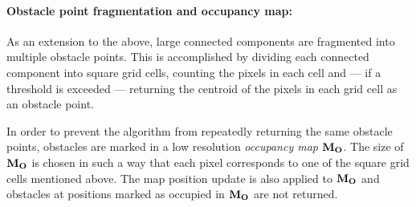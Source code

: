 \paragraph{Obstacle point fragmentation and occupancy map:} As an extension to the above, large connected components are fragmented into multiple obstacle points. This is accomplished by dividing each connected component into square grid cells, counting the pixels in each cell and --- if a threshold is exceeded --- returning the centroid of the pixels in each grid cell as an obstacle point.

In order to prevent the algorithm from repeatedly returning the same obstacle points, obstacles are marked in a low resolution \textit{occupancy map} $\mathbf{M_O}$. The size of $\mathbf{M_O}$ is chosen in such a way that each pixel corresponds to one of the square grid cells mentioned above. The map position update is also applied to $\mathbf{M_O}$ and obstacles at positions marked as occupied in $\mathbf{M_O}$ are not returned.
